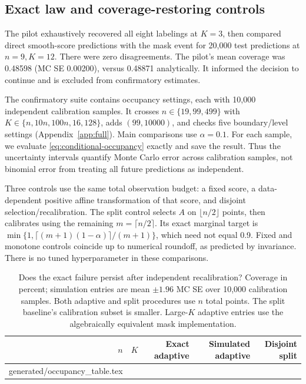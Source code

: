\documentclass{article}
\makeatletter
\newcommand{\inputtable}[1]{\@@input#1 }
\makeatother
\begin{document}
\subsection{Exact law and coverage-restoring controls}

The pilot exhaustively recovered all eight labelings at $K=3$, then compared direct smooth-score predictions with the mask event for 20,000 test predictions at $n=9,K=12$. There were zero disagreements. The pilot's mean coverage was 0.48598 (MC SE 0.00200), versus 0.48871 analytically. It informed the decision to continue and is excluded from confirmatory estimates.

The confirmatory suite contains \NumOccupancyCases{} occupancy settings, each with 10,000 independent calibration samples. It crosses $n\in\{19,99,499\}$ with $K\in\{n,10n,100n,16,128\}$, adds $(99,10000)$, and checks five boundary/level settings (Appendix~\ref{app:full}). Main comparisons use $\alpha=0.1$. For each sample, we evaluate \cref{eq:conditional-occupancy} exactly and save the result. Thus the uncertainty intervals quantify Monte Carlo error across calibration samples, not binomial error from treating all future predictions as independent.

Three controls use the same total observation budget: a fixed score, a data-dependent positive affine transformation of that score, and disjoint selection/recalibration. The split control selects $A$ on $\lfloor n/2\rfloor$ points, then calibrates using the remaining $m=\lceil n/2\rceil$. Its exact marginal target is $\min\{1,\lceil(m+1)(1-\alpha)\rceil/(m+1)\}$, which need not equal 0.9. Fixed and monotone controls coincide up to numerical roundoff, as predicted by invariance. There is no tuned hyperparameter in these comparisons.

\begin{table}[t]
\caption{Does the exact failure persist after independent recalibration? Coverage in percent; simulation entries are mean $\pm1.96$ MC SE over 10,000 calibration samples. Both adaptive and split procedures use $n$ total points. The split baseline's calibration subset is smaller. Large-$K$ adaptive entries use the algebraically equivalent mask implementation.}
\label{tab:occupancy}\centering
\begin{tabular}{rrrrr}
\toprule
$n$ & $K$ & Exact adaptive & Simulated adaptive & Disjoint split \\
\midrule
\inputtable{generated/occupancy_table.tex}
\bottomrule
\end{tabular}
\end{table}
\end{document}
